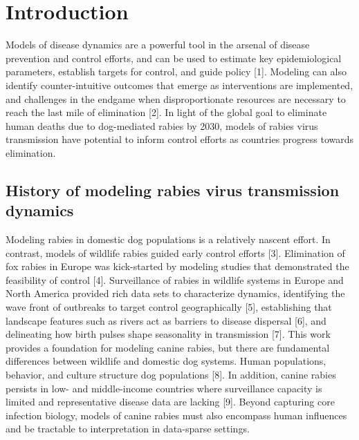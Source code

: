 \documentclass[
]{book}
\begin{document}
\hypertarget{introduction-3}{%
\section{Introduction}\label{introduction-3}}

Models of disease dynamics are a powerful tool in the arsenal of disease
prevention and control efforts, and can be used to estimate key
epidemiological parameters, establish targets for control, and guide
policy {[}1{]}. Modeling can also identify counter-intuitive outcomes that
emerge as interventions are implemented, and challenges in the endgame
when disproportionate resources are necessary to reach the last mile of
elimination {[}2{]}. In light of the global goal to eliminate human deaths
due to dog-mediated rabies by 2030, models of rabies virus transmission
have potential to inform control efforts as countries progress towards
elimination.

\hypertarget{history-of-modeling-rabies-virus-transmission-dynamics}{%
\subsection{History of modeling rabies virus transmission dynamics}\label{history-of-modeling-rabies-virus-transmission-dynamics}}

Modeling rabies in domestic dog populations is a relatively nascent
effort. In contrast, models of wildlife rabies guided early control
efforts {[}3{]}. Elimination of fox rabies in Europe was kick-started by
modeling studies that demonstrated the feasibility of control {[}4{]}.
Surveillance of rabies in wildlife systems in Europe and North America
provided rich data sets to characterize dynamics, identifying the wave
front of outbreaks to target control geographically {[}5{]}, establishing
that landscape features such as rivers act as barriers to disease
dispersal {[}6{]}, and delineating how birth pulses shape seasonality in
transmission {[}7{]}. This work provides a foundation for modeling canine
rabies, but there are fundamental differences between wildlife and
domestic dog systems. Human populations, behavior, and culture structure
dog populations {[}8{]}. In addition, canine rabies persists in low- and
middle-income countries where surveillance capacity is limited and
representative disease data are lacking {[}9{]}. Beyond capturing core
infection biology, models of canine rabies must also encompass human
influences and be tractable to interpretation in data-sparse settings.
\end{document}

